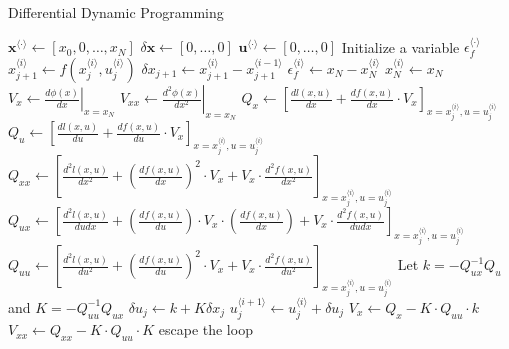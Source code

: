 \documentclass{article}
\begin{document}
\begin{algorithm}[t]
\caption{Differential Dynamic Programming}\label{DDP}
\renewcommand{\algorithmicrequire}{\textbf{Input:}}
\begin{algorithmic}[1]
\State $\mathbf{x}^{\langle \cdot \rangle}\leftarrow [x_0,0,\ldots,x_N]$
\State $\delta\mathbf{x}\leftarrow [0,\ldots,0]$
\State $\mathbf{u}^{\langle \cdot \rangle}\leftarrow [0,\ldots,0]$
\State Initialize a variable $\epsilon_f^{\langle \cdot \rangle}$
\textcolor{gray}{}
\textcolor{gray}{}
\State $x_{j+1}^{\langle i \rangle} \leftarrow f(x_j^{\langle i \rangle},u_j^{\langle i \rangle})$
\State $\delta x_{j+1} \leftarrow x_{j+1}^{\langle i \rangle} - x_{j+1}^{\langle i-1 \rangle}$
\EndIf
\EndFor
\State $\epsilon_f^{\langle i \rangle} \leftarrow x_N - x_N^{\langle i \rangle}$
\State $x_N^{\langle i \rangle} \leftarrow x_N$
\State $V_x \leftarrow \left.\frac{d\phi(x)}{dx}\right|_{x=x_N}$
\State $V_{xx} \leftarrow \left.\frac{d^2\phi(x)}{dx^2}\right|_{x=x_N}$
 \textcolor{gray}{}
\State $Q_x \leftarrow \left[\frac{dl(x,u)}{dx}+\frac{df(x,u)}{dx}\cdot V_x\right]_{x=x_j^{\langle i \rangle},u=u_j^{\langle i \rangle}}$
\State $Q_u \leftarrow \left[\frac{dl(x,u)}{du}+\frac{df(x,u)}{du}\cdot V_x\right]_{x=x_j^{\langle i \rangle},u=u_j^{\langle i \rangle}}$
\State $Q_{xx} \leftarrow \left[\frac{d^2l(x,u)}{dx^2}+\left(\frac{df(x,u)}{dx}\right)^2\cdot V_x + V_x \cdot \frac{d^2f(x,u)}{dx^2}\right]_{x=x_j^{\langle i \rangle},u=u_j^{\langle i \rangle}}$
\State $Q_{ux} \leftarrow \left[\frac{d^2l(x,u)}{dudx}+\left(\frac{df(x,u)}{du}\right)\cdot V_x \cdot \left(\frac{df(x,u)}{dx}\right) + V_x \cdot \frac{d^2f(x,u)}{dudx}\right]_{x=x_j^{\langle i \rangle},u=u_j^{\langle i \rangle}}$
\State $Q_{uu} \leftarrow \left[\frac{d^2l(x,u)}{du^2}+\left(\frac{df(x,u)}{du}\right)^2\cdot V_x + V_x \cdot \frac{d^2f(x,u)}{du^2}\right]_{x=x_j^{\langle i \rangle},u=u_j^{\langle i \rangle}}$
\State Let $k=-Q_{ux}^{-1}Q_{u}$ and $K=-Q_{uu}^{-1}Q_{ux}$
\State $\delta u_j \leftarrow k+K\delta x_j$\textcolor{gray}{}
\State $ u_j^{\langle i+1\rangle} \leftarrow u_j^{\langle i\rangle} + \delta u_j$
\State $V_x \leftarrow Q_x-K\cdot Q_{uu}\cdot k$\textcolor{gray}{}
\State $V_{xx} \leftarrow Q_{xx}-K\cdot Q_{uu}\cdot K$
\EndFor
{}
escape the loop
\EndIf
\EndFor
\end{algorithmic}
\end{algorithm}
\end{document}
